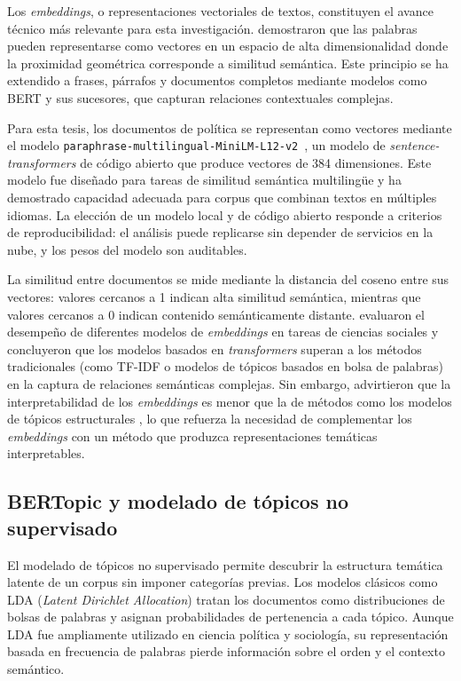 Los \textit{embeddings}, o representaciones vectoriales de textos, constituyen el avance técnico más relevante para esta investigación. \citet{mikolov2013efficient} demostraron que las palabras pueden representarse como vectores en un espacio de alta dimensionalidad donde la proximidad geométrica corresponde a similitud semántica. Este principio se ha extendido a frases, párrafos y documentos completos mediante modelos como BERT \citep{devlin2019bert} y sus sucesores, que capturan relaciones contextuales complejas.

Para esta tesis, los documentos de política se representan como vectores mediante el modelo \texttt{paraphrase-multilingual-MiniLM-L12-v2}~\citep{reimers2019sentencebert}, un modelo de \textit{sentence-transformers} de código abierto que produce vectores de 384 dimensiones. Este modelo fue diseñado para tareas de similitud semántica multilingüe y ha demostrado capacidad adecuada para corpus que combinan textos en múltiples idiomas. La elección de un modelo local y de código abierto responde a criterios de reproducibilidad: el análisis puede replicarse sin depender de servicios en la nube, y los pesos del modelo son auditables.

La similitud entre documentos se mide mediante la distancia del coseno entre sus vectores: valores cercanos a 1 indican alta similitud semántica, mientras que valores cercanos a 0 indican contenido semánticamente distante. \citet{rodriguez2022embeddings} evaluaron el desempeño de diferentes modelos de \textit{embeddings} en tareas de ciencias sociales y concluyeron que los modelos basados en \textit{transformers} superan a los métodos tradicionales (como TF-IDF o modelos de tópicos basados en bolsa de palabras) en la captura de relaciones semánticas complejas. Sin embargo, advirtieron que la interpretabilidad de los \textit{embeddings} es menor que la de métodos como los modelos de tópicos estructurales \citep{roberts2019stm}, lo que refuerza la necesidad de complementar los \textit{embeddings} con un método que produzca representaciones temáticas interpretables.


\subsection{BERTopic y modelado de tópicos no supervisado}

El modelado de tópicos no supervisado permite descubrir la estructura temática latente de un corpus sin imponer categorías previas. Los modelos clásicos como LDA (\textit{Latent Dirichlet Allocation}) tratan los documentos como distribuciones de bolsas de palabras y asignan probabilidades de pertenencia a cada tópico. Aunque LDA fue ampliamente utilizado en ciencia política y sociología, su representación basada en frecuencia de palabras pierde información sobre el orden y el contexto semántico.

